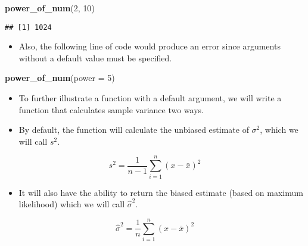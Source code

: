 \documentclass[]{book}
\newenvironment{Shaded}{\begin{snugshade}}{\end{snugshade}}
\newcommand{\KeywordTok}[1]{\textcolor[rgb]{0.13,0.29,0.53}{\textbf{#1}}}
\newcommand{\DataTypeTok}[1]{\textcolor[rgb]{0.13,0.29,0.53}{#1}}
\newcommand{\DecValTok}[1]{\textcolor[rgb]{0.00,0.00,0.81}{#1}}
\newcommand{\NormalTok}[1]{#1}
\providecommand{\tightlist}{%
  \setlength{\itemsep}{0pt}\setlength{\parskip}{0pt}}
\begin{document}
\begin{Shaded}
\begin{Highlighting}[]
\KeywordTok{power_of_num}\NormalTok{(}\DecValTok{2}\NormalTok{, }\DecValTok{10}\NormalTok{)}
\end{Highlighting}
\end{Shaded}

\begin{verbatim}
## [1] 1024
\end{verbatim}

\begin{itemize}
\tightlist
\item
  Also, the following line of code would produce an error since
  arguments without a default value must be specified.
\end{itemize}

\begin{Shaded}
\begin{Highlighting}[]
\KeywordTok{power_of_num}\NormalTok{(}\DataTypeTok{power =} \DecValTok{5}\NormalTok{)}
\end{Highlighting}
\end{Shaded}

\begin{itemize}
\item
  To further illustrate a function with a default argument, we will
  write a function that calculates sample variance two ways.
\item
  By default, the function will calculate the unbiased estimate of
  \(\sigma^2\), which we will call \(s^2\).
\end{itemize}

\[
s^2 = \frac{1}{n - 1}\sum_{i=1}^{n}(x - \bar{x})^2
\]

\begin{itemize}
\tightlist
\item
  It will also have the ability to return the biased estimate (based on
  maximum likelihood) which we will call \(\hat{\sigma}^2\).
\end{itemize}

\[
\hat{\sigma}^2 = \frac{1}{n}\sum_{i=1}^{n}(x - \bar{x})^2
\]
\end{document}
